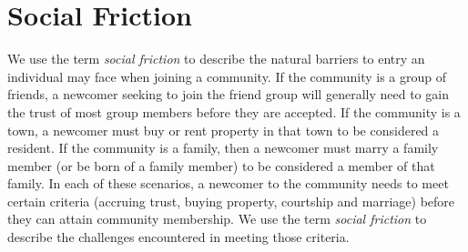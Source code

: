 \documentclass[sigconf,authordraft]{acmart}
\begin{document}


\section{Social Friction}


We use the term {\itshape social friction} to describe the natural barriers to entry an individual may face when joining a community. If the community is a group of friends, a newcomer seeking to join the friend group will generally need to gain the trust of most group members before they are accepted. If the community is a town, a newcomer must buy or rent property in that town to be considered a resident. If the community is a family, then a newcomer must marry a family member (or be born of a family member) to be considered a member of that family. In each of these scenarios, a newcomer to the community needs to meet certain criteria (accruing trust, buying property, courtship and marriage) before they can attain community membership. We use the term {\itshape social friction} to describe the challenges encountered in meeting those criteria. 
\end{document}
